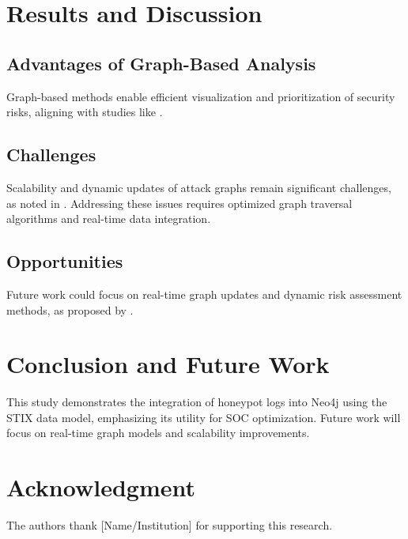 \documentclass[conference]{IEEEtran}
\begin{document}
\section{Results and Discussion}
\subsection{Advantages of Graph-Based Analysis}
Graph-based methods enable efficient visualization and prioritization of security risks, aligning with studies like \cite{banati2022attackgraphs}.

\subsection{Challenges}
Scalability and dynamic updates of attack graphs remain significant challenges, as noted in \cite{simonnagy2022attackgraphs}. Addressing these issues requires optimized graph traversal algorithms and real-time data integration.


\subsection{Opportunities}
Future work could focus on real-time graph updates and dynamic risk assessment methods, as proposed by \cite{neo4jguide}.

\section{Conclusion and Future Work}
This study demonstrates the integration of honeypot logs into Neo4j using the STIX data model, emphasizing its utility for SOC optimization. Future work will focus on real-time graph models and scalability improvements.

\section*{Acknowledgment}
The authors thank [Name/Institution] for supporting this research.



\end{document}
